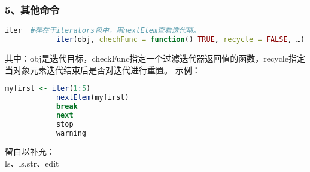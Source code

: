         \subsubsection{5、其他命令}
                \begin{lstlisting}[language=R]
            iter  #存在于iterators包中，用nextElem查看迭代项。
            iter(obj, chechFunc = function() TRUE, recycle = FALSE, …)
                \end{lstlisting}
            其中：obj是迭代目标，checkFunc指定一个过滤迭代器返回值的函数，recycle指定当对象元素迭代结束后是否对迭代进行重置。
            示例：
                \begin{lstlisting}[language=R]
            myfirst <- iter(1:5)
            nextElem(myfirst)
            break
            next
            stop
            warning
                \end{lstlisting}
            留白以补充：\\
            ls、ls.str、edit



